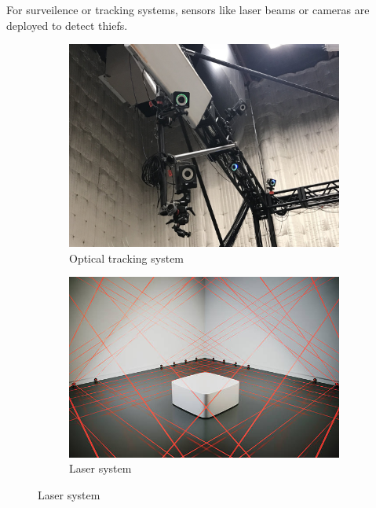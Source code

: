 For surveilence or tracking systems, 
sensors like laser beams or cameras are deployed to detect thiefs. 
\begin{figure}[ht] 
    \centering 
    
    \begin{subfigure}[b]{0.41\textwidth} 
        \includegraphics[width=\textwidth]{figures/optitrack.jpg} 
        \caption{Optical tracking system} 
        \label{fig:intro_optitrack} 
    \end{subfigure} 
    \begin{subfigure} [b]{0.46\textwidth} 
        \includegraphics[width=\textwidth]{figures/laser.jpg} 
        \caption{Laser system} 
        \label{fig:intro_laser} 
    \end{subfigure} 
\end{figure} 

